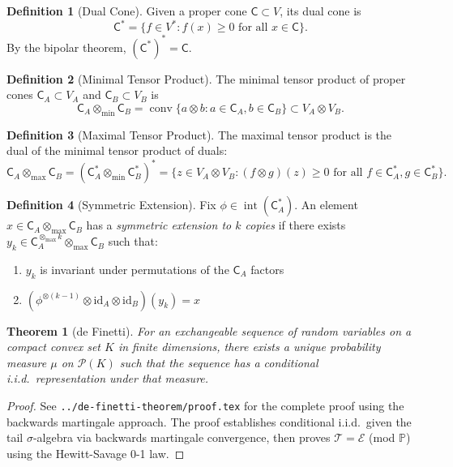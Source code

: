 \documentclass[11pt,a4paper]{article}
\theoremstyle{definition}
\newtheorem{definition}{Definition}[section]
\theoremstyle{plain}
\newtheorem{theorem}{Theorem}[section]
\DeclareMathOperator{\conv}{conv}
\DeclareMathOperator{\inte}{int}
\newcommand{\tmin}{{\otimes_{\min}}}
\newcommand{\tmax}{{\otimes_{\max}}}
\newcommand{\C}{\mathsf{C}}
\begin{document}
\begin{definition}[Dual Cone]
Given a proper cone $\C \subset V$, its dual cone is
\[
\C^* = \{f \in V^* : f(x) \geq 0 \text{ for all } x \in \C\}.
\]
By the bipolar theorem, $(\C^*)^* = \C$.
\end{definition}

\begin{definition}[Minimal Tensor Product] \label{def:min}
The minimal tensor product of proper cones $\C_A \subset V_A$ and $\C_B \subset V_B$ is
\[
\C_A \tmin \C_B = \conv\{a \otimes b : a \in \C_A, b \in \C_B\} \subset V_A \otimes V_B.
\]
\end{definition}

\begin{definition}[Maximal Tensor Product] \label{def:max}
The maximal tensor product is the dual of the minimal tensor product of duals:
\[
\C_A \tmax \C_B = (\C_A^* \tmin \C_B^*)^* = \{z \in V_A \otimes V_B : (f \otimes g)(z) \geq 0 \text{ for all } f \in \C_A^*, g \in \C_B^*\}.
\]
\end{definition}

\begin{definition}[Symmetric Extension] \label{def:symext}
Fix $\phi \in \inte(\C_A^*)$. An element $x \in \C_A \tmax \C_B$ has a \emph{symmetric extension to $k$ copies} if there exists $y_k \in \C_A^{\tmax k} \tmax \C_B$ such that:
\begin{enumerate}
\item $y_k$ is invariant under permutations of the $\C_A$ factors
\item $(\phi^{\otimes(k-1)} \otimes \mathrm{id}_A \otimes \mathrm{id}_B)(y_k) = x$
\end{enumerate}
\end{definition}

\begin{theorem}[de Finetti] \label{thm:definetti}
For an exchangeable sequence of random variables on a compact convex set $K$ in finite dimensions, there exists a unique probability measure $\mu$ on $\mathcal{P}(K)$ such that the sequence has a conditional i.i.d.\ representation under that measure.
\end{theorem}

\begin{proof}
See \texttt{../de-finetti-theorem/proof.tex} for the complete proof using the backwards martingale approach. The proof establishes conditional i.i.d.\ given the tail $\sigma$-algebra via backwards martingale convergence, then proves $\mathcal{T} = \mathcal{E}$ (mod $\mathbb{P}$) using the Hewitt-Savage 0-1 law.
\end{proof}
\end{document}
